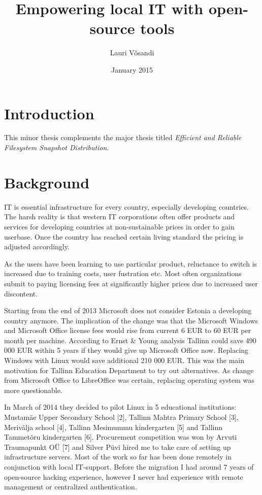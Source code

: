 \documentclass{article}
\title{Empowering local IT with open-source tools}
\author{Lauri Võsandi}
\date{January 2015}
\begin{document}
\maketitle

\section{Introduction}

This minor thesis complements the major thesis
titled \emph{Efficient and Reliable Filesystem Snapshot Distribution}.


\section{Background}

IT is essential infrastructure for every country, especially developing countries.
The harsh reality is that western IT corporations often offer products
and services for developing countries at non-sustainable prices in order
to gain userbase. Once the country has reached certain living standard the
pricing is adjusted accordingly.

As the users have been learning to use particular product,
reluctance to switch is increased due to training costs,
user fustration etc. Most often organizations submit to paying
licensing fees at significantly higher prices due to increased
user discontent.

Starting from the end of 2013 Microsoft does not consider Estonia a
developing country anymore. The implication of the change was that
the Microsoft Windows and Microsoft Office license fees would rise
from current 6 EUR to 60 EUR per month per machine.
According to Ernst \& Young analysis Tallinn could save 490 000 EUR
within 5 years if they would give up Microsoft Office now.
Replacing Windows with Linux would save additional 210 000 EUR.
This was the main motivation for Tallinn Education Department to try
out alternatives. As change from Microsoft Office to LibreOffice was
certain, replacing operating system was more questionable.

In March of 2014 they decided to pilot Linux in 5 educational
institutions: Mustamäe Upper Secondary School [2], Tallinn Mahtra
Primary School [3], Merivälja school [4], Tallinn Mesimummu
kindergarten [5] and Tallinn Tammetõru kindergarten [6].
Procurement competition was won by Arvuti Traumapunkt OÜ [7] and
Silver Püvi hired me to take care of setting up infrastructure servers.
Most of the work so far has been done remotely in conjunction with
local IT-support. Before the migration I had around 7 years of
open-source hacking experience, however I never had experience with
remote management or centralized authentication.
\end{document}
